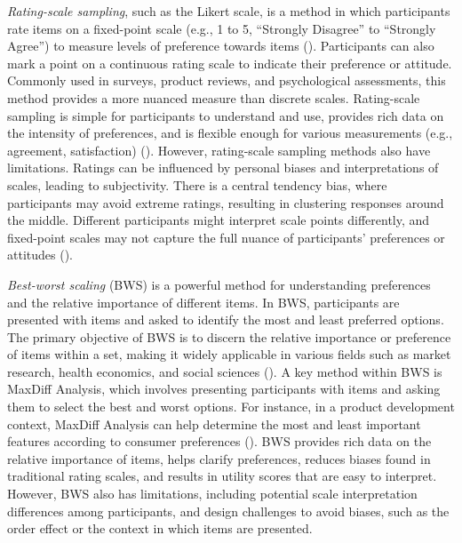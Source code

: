 \documentclass[
  letterpaper,
  numbers=noenddot,
  DIV=11]{scrreprt}
\theoremstyle{definition}
\theoremstyle{plain}
\theoremstyle{plain}
\theoremstyle{remark}
\begin{document}
\emph{Rating-scale sampling}, such as the Likert scale, is a method in
which participants rate items on a fixed-point scale (e.g., 1 to 5,
``Strongly Disagree'' to ``Strongly Agree'') to measure levels of
preference towards items ().
Participants can also mark a point on a continuous rating scale to
indicate their preference or attitude. Commonly used in surveys, product
reviews, and psychological assessments, this method provides a more
nuanced measure than discrete scales. Rating-scale sampling is simple
for participants to understand and use, provides rich data on the
intensity of preferences, and is flexible enough for various
measurements (e.g., agreement, satisfaction)
(). However, rating-scale sampling
methods also have limitations. Ratings can be influenced by personal
biases and interpretations of scales, leading to subjectivity. There is
a central tendency bias, where participants may avoid extreme ratings,
resulting in clustering responses around the middle. Different
participants might interpret scale points differently, and fixed-point
scales may not capture the full nuance of participants' preferences or
attitudes ().

\emph{Best-worst scaling} (BWS) is a powerful method for understanding
preferences and the relative importance of different items. In BWS,
participants are presented with items and asked to identify the most and
least preferred options. The primary objective of BWS is to discern the
relative importance or preference of items within a set, making it
widely applicable in various fields such as market research, health
economics, and social sciences (). A key method within BWS is MaxDiff Analysis, which
involves presenting participants with items and asking them to select
the best and worst options. For instance, in a product development
context, MaxDiff Analysis can help determine the most and least
important features according to consumer preferences
(). BWS provides
rich data on the relative importance of items, helps clarify
preferences, reduces biases found in traditional rating scales, and
results in utility scores that are easy to interpret. However, BWS also
has limitations, including potential scale interpretation differences
among participants, and design challenges to avoid biases, such as the
order effect or the context in which items are presented.
\end{document}
